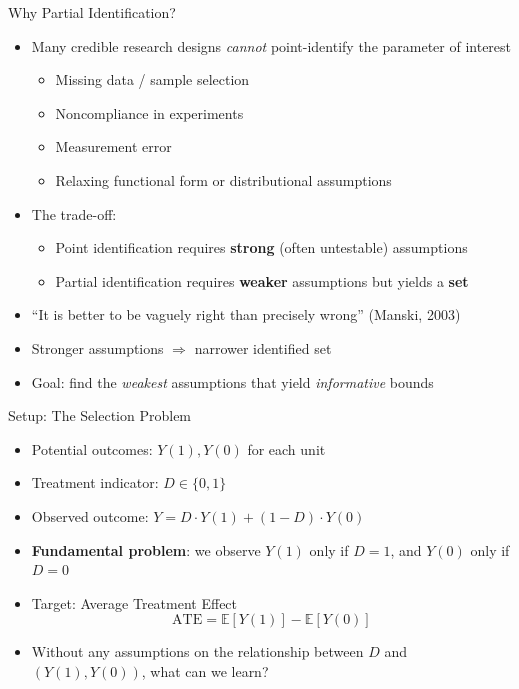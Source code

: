 \documentclass[10pt]{beamer}
\newcommand{\E}{\mathbb{E}}
\begin{document}
\begin{frame}{Why Partial Identification?}
  \begin{itemize}
    \item Many credible research designs \textit{cannot} point-identify the parameter of interest
      \begin{itemize}
        \item Missing data / sample selection
        \item Noncompliance in experiments
        \item Measurement error
        \item Relaxing functional form or distributional assumptions
      \end{itemize}
      \item The trade-off:
      \begin{itemize}
        \item Point identification requires \textbf{strong} (often untestable) assumptions
        \item Partial identification requires \textbf{weaker} assumptions but yields a \textbf{set}
      \end{itemize}
      \item ``It is better to be vaguely right than precisely wrong'' (Manski, 2003)
    \item Stronger assumptions $\Rightarrow$ narrower identified set
    \item Goal: find the \textit{weakest} assumptions that yield \textit{informative} bounds
  \end{itemize}
\end{frame}


\begin{frame}{Setup: The Selection Problem}
  \begin{itemize}
    \item Potential outcomes: $Y(1), Y(0)$ for each unit
    \item Treatment indicator: $D \in \{0,1\}$
    \item Observed outcome: $Y = D \cdot Y(1) + (1-D) \cdot Y(0)$
    \item \textbf{Fundamental problem}: we observe $Y(1)$ only if $D=1$, and $Y(0)$ only if $D=0$
    \item Target: Average Treatment Effect
      $$
        \text{ATE} = \E[Y(1)] - \E[Y(0)]
      $$
    \item Without any assumptions on the relationship between $D$ and $(Y(1), Y(0))$, what can we learn?
  \end{itemize}
\end{frame}
\end{document}
